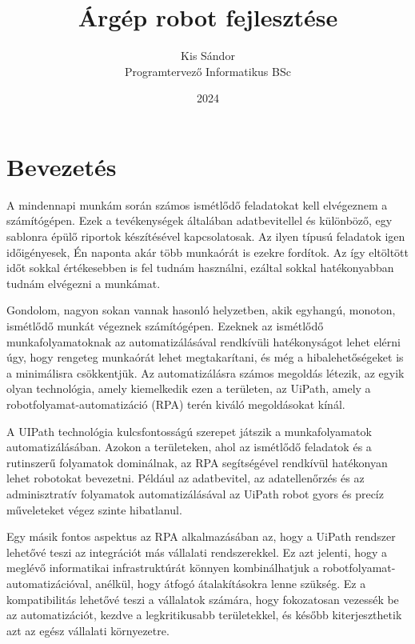 \documentclass[
]{thesis-ekf}
\theoremstyle{definition}
\theoremstyle{remark}
\begin{document}
\title{Árgép robot fejlesztése}
\author{Kis Sándor\\Programtervező Informatikus BSc}
\date{2024}
\maketitle
\tableofcontents

\chapter*{Bevezetés}
A mindennapi munkám során számos ismétlődő feladatokat kell elvégeznem a számítógépen. Ezek a tevékenységek általában adatbevitellel és különböző, egy sablonra épülő riportok készítésével kapcsolatosak. Az ilyen típusú feladatok igen időigényesek, Én naponta akár több munkaórát is ezekre fordítok. Az így eltöltött időt sokkal értékesebben is fel tudnám használni, ezáltal sokkal hatékonyabban tudnám elvégezni a munkámat.

Gondolom, nagyon sokan vannak hasonló helyzetben, akik egyhangú, monoton, ismétlődő munkát végeznek számítógépen. Ezeknek az ismétlődő munkafolyamatoknak az automatizálásával rendkívüli hatékonyságot lehet elérni úgy, hogy rengeteg munkaórát lehet megtakarítani, és még a hibalehetőségeket is a minimálisra csökkentjük. Az automatizálásra számos megoldás létezik, az egyik olyan technológia, amely kiemelkedik ezen a területen, az UiPath, amely a robotfolyamat-automatizáció (RPA) terén kiváló megoldásokat kínál.

A UIPath technológia kulcsfontosságú szerepet játszik a munkafolyamatok automatizálásában. Azokon a területeken, ahol az ismétlődő feladatok és a rutinszerű folyamatok dominálnak, az RPA segítségével rendkívül hatékonyan lehet robotokat bevezetni. Például az adatbevitel, az adatellenőrzés és az adminisztratív folyamatok automatizálásával az UiPath robot gyors és precíz műveleteket végez szinte hibatlanul.

Egy másik fontos aspektus az RPA alkalmazásában az, hogy a UiPath rendszer lehetővé teszi az integrációt más vállalati rendszerekkel. Ez azt jelenti, hogy a meglévő informatikai infrastruktúrát könnyen kombinálhatjuk a robotfolyamat-automatizációval, anélkül, hogy átfogó átalakításokra lenne szükség. Ez a kompatibilitás lehetővé teszi a vállalatok számára, hogy fokozatosan vezessék be az automatizációt, kezdve a legkritikusabb területekkel, és később kiterjeszthetik azt az egész vállalati környezetre.
\end{document}
